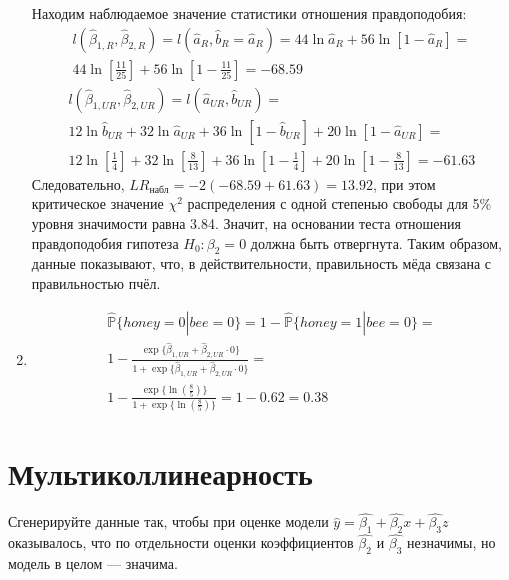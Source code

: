 \documentclass[pdftex,11pt,openany]{book}\usepackage[]{graphicx}\usepackage[]{color}
\begin{document}
\begin{solution}
\begin{enumerate}
Находим наблюдаемое значение статистики отношения правдоподобия:
\begin{multline}
l(\hat{\beta}_{1, R}, \hat{\beta}_{2, R}) = l(\hat{a}_R, \hat{b}_R = \hat{a}_R) = 44\ln\hat{a}_R + 56\ln[1-\hat{a}_R] =\\
 44\ln \left[ \frac{11}{25} \right] + 56\ln \left[ 1 - \frac{11}{25} \right] = -68.59
\end{multline}
\begin{multline}
l(\hat{\beta}_{1, UR}, \hat{\beta}_{2, UR}) = l(\hat{a}_{UR}, \hat{b}_{UR}) =\\
 12\ln \hat{b}_{UR} + 32 \ln \hat{a}_{UR} + 36\ln[1 - \hat{b}_{UR}] + 20\ln[1 - \hat{a}_{UR}] = \\
12\ln \left[ \frac{1}{4} \right] + 32\ln \left[ \frac{8}{13} \right] + 36\ln \left[ 1 - \frac{1}{4} \right] + 20\ln \left[1 - \frac{8}{13} \right] = -61.63
\end{multline}
Следовательно, $LR_{\text{набл}} = -2(-68.59 + 61.63) = 13.92$, при этом критическое значение $\chi^2$ распределения с одной степенью свободы для 5\% уровня значимости равна 3.84. Значит, на основании теста отношения правдоподобия гипотеза $H_0: \beta_2 = 0$ должна быть отвергнута. Таким образом, данные показывают, что, в действительности, правильность мёда связана с правильностью пчёл.

\item 
\begin{multline}
\hat{\mathbb{P}}\{honey = 0| bee = 0\} = 1 - \hat{\mathbb{P}}\{honey=1|bee=0\} = \\
1 - \frac{\exp\{\hat{\beta}_{1, UR} + \hat{\beta}_{2, UR} \cdot 0\}}{1 + \exp\{\hat{\beta}_{1, UR} + \hat{\beta}_{2, UR} \cdot 0\}} =\\
1 - \frac{\exp\{\ln\left( \frac{8}{5} \right)\}}{1 + \exp\{\ln\left( \frac{8}{5} \right)\}} = 1 - 0.62 = 0.38
\end{multline}
\end{enumerate}
\end{solution}











\chapter{Мультиколлинеарность}


\begin{problem}
Сгенерируйте данные так, чтобы при оценке модели $\hat{y}=\hat{\beta_1}+\hat{\beta_2}x+\hat{\beta_3}z$ оказывалось, что по отдельности оценки коэффициентов $\hat{\beta_2}$ и $\hat{\beta_3}$ незначимы, но модель в целом --- значима.
\end{problem}
\begin{solution}
\end{solution}
\end{document}

